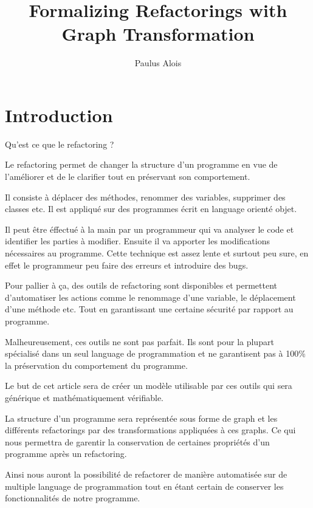 \documentclass[a4paper, 12pt]{article}
\title{Formalizing Refactorings with Graph Transformation}
\author{Paulus Alois}
\begin{document}
  \maketitle

  \tableofcontents

  \newpage

  \section{Introduction}

  Qu'est ce que le refactoring ?

  Le refactoring permet de changer la structure d'un programme en vue de l'améliorer et de le clarifier tout en préservant son comportement.

  Il consiste à déplacer des méthodes, renommer des variables, supprimer des classes etc. Il est appliqué sur des programmes écrit en language orienté objet.

  Il peut être éffectué à la main par un programmeur qui va analyser le code et identifier les parties à modifier. Ensuite il va apporter les modifications nécessaires au programme.
  Cette technique est assez lente et surtout peu sure, en effet le programmeur peu faire des erreurs et introduire des bugs.

  Pour pallier à ça, des outils de refactoring sont disponibles et permettent d'automatiser les actions comme le renommage d'une variable, le déplacement d'une méthode etc.
  Tout en garantissant une certaine sécurité par rapport au programme.

  Malheureusement, ces outils ne sont pas parfait. Ils sont pour la plupart spécialisé dans un seul language de programmation et ne garantisent pas à 100\% la préservation du comportement du programme.

  Le but de cet article sera de créer un modèle utilisable par ces outils qui sera générique et mathématiquement vérifiable.

  La structure d'un programme sera représentée sous forme de graph et les différents refactorings par des transformations appliquées à ces graphs.
  Ce qui nous permettra de garentir la conservation de certaines propriétés d'un programme après un refactoring.

  Ainsi nous auront la possibilité de refactorer de manière automatisée sur de multiple language de programmation tout en étant certain de conserver les fonctionnalités de notre programme.

  \newpage
\end{document}

